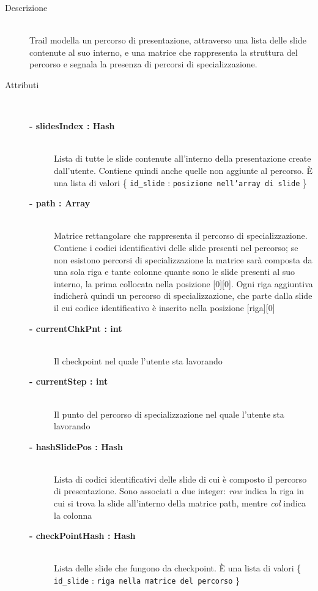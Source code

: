 \begin{description}
\item[Descrizione] \hfill \\
	Trail modella un percorso di presentazione, attraverso una lista delle slide contenute al suo interno, e una matrice che rappresenta la struttura del percorso e segnala la presenza di percorsi di specializzazione.
	
	

	
	
\item[Attributi] \hfill \\
	\begin{description}
		\item[\textbf{- slidesIndex : Hash			}] \hfill \\
			Lista di tutte le slide contenute all'interno della presentazione create dall'utente. Contiene quindi anche quelle non aggiunte al percorso. È una lista di valori \{ \texttt{id_slide} : \texttt{posizione nell'array di slide} \}
		\item[\textbf{- path : Array			}] \hfill \\
			Matrice rettangolare che rappresenta il percorso di specializzazione. Contiene i codici identificativi delle slide presenti nel percorso; se non esistono percorsi di specializzazione la matrice sarà composta da una sola riga e tante colonne quante sono le slide presenti al suo interno, la prima collocata nella posizione [0][0]. Ogni riga aggiuntiva indicherà quindi un percorso di specializzazione, che parte dalla slide il cui codice identificativo è inserito nella posizione [riga][0]
			\item[\textbf{- currentChkPnt : int			}] \hfill \\
			Il checkpoint nel quale l'utente sta lavorando
			\item[\textbf{- currentStep : int			}] \hfill \\
			Il punto del percorso di specializzazione nel quale l'utente sta lavorando
			\item[\textbf{- hashSlidePos : Hash			}] \hfill \\
			Lista di codici identificativi delle slide di cui è composto il percorso di presentazione. Sono associati a due integer: \textit{row} indica la riga in cui si trova la slide all'interno della matrice path, mentre \textit{col} indica la colonna
			\item[\textbf{- checkPointHash : Hash		}] \hfill \\
			Lista delle slide che fungono da checkpoint. È una lista di valori  \{ \texttt{id_slide} : \texttt{riga nella matrice del percorso} \}
	\end{description}
	

\end{description}
